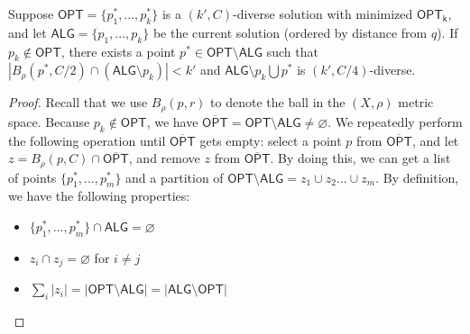 \begin{lemma}\label{lm:p_star_exists_diverse}
Suppose $\mathsf{OPT}=\{p^*_1,...,p^*_k\}$ is a $(k',C)$-diverse solution with minimized $\mathsf{OPT_k}$, and let $\mathsf{ALG}=\{p_1,...,p_k\}$ be the current solution (ordered by distance from $q$). If $p_k\notin \mathsf{OPT}$, there exists a point $p^*\in \mathsf{OPT}\setminus \mathsf{ALG}$ such that $|B_{\rho}(p^*,C/2)\cap (\mathsf{ALG}\setminus p_k)|<k'$ and $\mathsf{ALG}\setminus p_k\bigcup p^*$ is $(k',C/4)$-diverse.
\end{lemma}

\begin{proof}

Recall that we use $B_{\rho}(p,r)$ to denote the ball in the $(X,\rho)$ metric space. Because $p_k\notin \mathsf{OPT}$, we have $\overline{\mathsf{OPT}}=\mathsf{OPT}\setminus \mathsf{ALG}\neq \varnothing$. We repeatedly perform the following operation until $\overline{\mathsf{OPT}}$ gets empty: select a point $p$ from $\overline{\mathsf{OPT}}$, and let $z=B_{\rho}(p,C)\cap \overline{\mathsf{OPT}}$, and remove $z$ from $\overline{\mathsf{OPT}}$. By doing this, we can get a list of points $\{p^*_1,...,p^*_m\}$ and a partition of $\mathsf{OPT}\setminus \mathsf{ALG}=z_1\cup z_2...\cup z_m$. By definition, we have the following properties:

\begin{itemize}
    \item $\{p^*_1,...,p^*_m\}\cap \mathsf{ALG}=\varnothing$
    \item $z_i\cap z_j=\varnothing$ for $i\neq j$
    \item $\sum_i |z_i|=|\mathsf{OPT}\setminus \mathsf{ALG}|=|\mathsf{ALG}\setminus \mathsf{OPT}|$
\end{itemize}


\end{proof}
